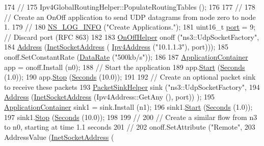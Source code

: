 \begin{DoxyCode}
174   \textcolor{comment}{//}
175   Ipv4GlobalRoutingHelper::PopulateRoutingTables ();
176 
177   \textcolor{comment}{//}
178   \textcolor{comment}{// Create an OnOff application to send UDP datagrams from node zero to node 1.}
179   \textcolor{comment}{//}
180   \hyperlink{group__logging_gafbd73ee2cf9f26b319f49086d8e860fb}{NS\_LOG\_INFO} (\textcolor{stringliteral}{"Create Applications."});
181   uint16\_t \hyperlink{dsdv-manet_8cc_a8e0798404bf2cf5dabb84c5ba9a4f236}{port} = 9;   \textcolor{comment}{// Discard port (RFC 863)}
182 
183   \hyperlink{classns3_1_1OnOffHelper}{OnOffHelper} onoff (\textcolor{stringliteral}{"ns3::UdpSocketFactory"}, 
184                      \hyperlink{classns3_1_1Address}{Address} (\hyperlink{classns3_1_1InetSocketAddress}{InetSocketAddress} (
      \hyperlink{classns3_1_1Ipv4Address}{Ipv4Address} (\textcolor{stringliteral}{"10.1.1.3"}), port)));
185   onoff.SetConstantRate (\hyperlink{classns3_1_1DataRate}{DataRate} (\textcolor{stringliteral}{"500kb/s"}));
186 
187   \hyperlink{classns3_1_1ApplicationContainer}{ApplicationContainer} app = onoff.Install (n0);
188   \textcolor{comment}{// Start the application}
189   app.\hyperlink{classns3_1_1ApplicationContainer_a8eff87926507020bbe3e1390358a54a7}{Start} (\hyperlink{group__timecivil_ga33c34b816f8ff6628e33d5c8e9713b9e}{Seconds} (1.0));
190   app.\hyperlink{classns3_1_1ApplicationContainer_adfc52f9aa4020c8714679b00bbb9ddb3}{Stop} (\hyperlink{group__timecivil_ga33c34b816f8ff6628e33d5c8e9713b9e}{Seconds} (10.0));
191 
192   \textcolor{comment}{// Create an optional packet sink to receive these packets}
193   \hyperlink{classns3_1_1PacketSinkHelper}{PacketSinkHelper} sink (\textcolor{stringliteral}{"ns3::UdpSocketFactory"},
194                          \hyperlink{classns3_1_1Address}{Address} (\hyperlink{classns3_1_1InetSocketAddress}{InetSocketAddress} (Ipv4Address::GetAny (), port))
      );
195   \hyperlink{classns3_1_1ApplicationContainer}{ApplicationContainer} sink1 = sink.Install (n1);
196   sink1.\hyperlink{classns3_1_1ApplicationContainer_a8eff87926507020bbe3e1390358a54a7}{Start} (\hyperlink{group__timecivil_ga33c34b816f8ff6628e33d5c8e9713b9e}{Seconds} (1.0));
197   sink1.\hyperlink{classns3_1_1ApplicationContainer_adfc52f9aa4020c8714679b00bbb9ddb3}{Stop} (\hyperlink{group__timecivil_ga33c34b816f8ff6628e33d5c8e9713b9e}{Seconds} (10.0));
198 
199   \textcolor{comment}{// }
200   \textcolor{comment}{// Create a similar flow from n3 to n0, starting at time 1.1 seconds}
201   \textcolor{comment}{//}
202   onoff.SetAttribute (\textcolor{stringliteral}{"Remote"}, 
203                       AddressValue (\hyperlink{classns3_1_1InetSocketAddress}{InetSocketAddress} (

\end{DoxyCode}
